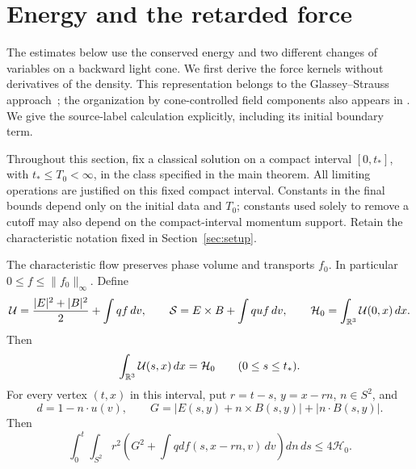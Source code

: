 \section{Energy and the retarded force}\label{ret:section}

The estimates below use the conserved energy and two different changes
of variables on a backward light cone. We first derive the force kernels
without derivatives of the density. This representation belongs to the
Glassey--Strauss approach~\cite{GlasseyStrauss1986}; the organization by
cone-controlled field components also appears in
\cite[Proposition~2.2 and Section~3]{LukStrain2014Continuation}.
We give the source-label calculation explicitly, including its initial
boundary term.

Throughout this section, fix a classical solution on a compact interval
$[0,t_*]$, with $t_*\leq T_0<\infty$, in the class specified in the main
theorem. All limiting operations are justified on this fixed compact
interval. Constants in the final bounds depend only on the initial
data and $T_0$; constants used solely to remove a cutoff may also depend
on the compact-interval momentum support. Retain the characteristic notation fixed in Section~\ref{sec:setup}.

\begin{lemma}\label{ret:energy}
The characteristic flow preserves phase volume and transports $f_0$.
In particular $0\leq f\leq\|f_0\|_\infty$. Define
\[
 \mathcal U=\frac{|E|^2+|B|^2}{2}+\int qf\,dv,
 \qquad
 \mathcal S=E\times B+\int quf\,dv,
 \qquad
 \mathcal H_0=\int_{\mathbb R^3}\mathcal U(0,x)\,dx.
\]
Then
\begin{equation}\label{eq:energy}
 \int_{\mathbb R^3}\mathcal U(s,x)\,dx=\mathcal H_0
 \qquad(0\leq s\leq t_*).
\end{equation}
For every vertex $(t,x)$ in this interval, put
$r=t-s$, $y=x-rn$, $n\in S^2$, and
\[
 d=1-n\cdot u(v),\qquad
 G=|E(s,y)+n\times B(s,y)|+|n\cdot B(s,y)|.
\]
Then
\begin{equation}\label{eq:cone-energy}
 \int_0^t\int_{S^2}r^2
 \left(G^2+\int qd f(s,x-rn,v)\,dv\right)dn\,ds
 \leq4\mathcal H_0.
\end{equation}
\end{lemma}

